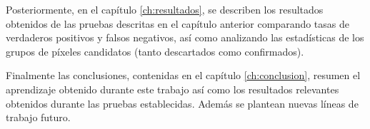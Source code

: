 \bigskip

Posteriormente, en el cap\'itulo \ref{ch:resultados}, se describen los resultados obtenidos de las pruebas descritas en el cap\'itulo anterior comparando tasas de verdaderos positivos y falsos negativos, as\'i como analizando las estad\'isticas de los grupos de p\'ixeles candidatos (tanto descartados como confirmados).  
\bigskip

Finalmente las conclusiones, contenidas en el cap\'itulo \ref{ch:conclusion}, resumen el aprendizaje obtenido durante este trabajo as\'i como los resultados relevantes obtenidos durante las pruebas establecidas. Adem\'as se plantean nuevas l\'ineas de trabajo futuro.



